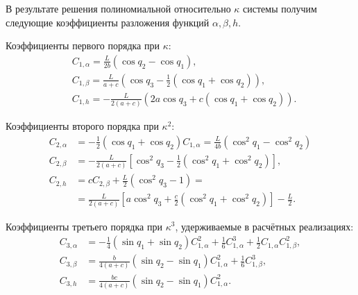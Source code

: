 В результате решения полиномиальной относительно $\kappa$ системы получим следующие коэффициенты разложения функций $\alpha,\beta,h$.

Коэффициенты первого порядка при $\kappa$:
\begin{equation}
\label{eq:DirectKinematicsCoefsApprox1}
\begin{aligned}
	& C_{1,\alpha} = \frac{L}{2b}\left(\cos{q_2} - \cos{q_1}\right),\\
	& C_{1,\beta} = \frac{L}{a+c}\left(\cos{q_3} - \frac{1}{2}\left(\cos{q_1} + \cos{q_2}\right)\right),\\
	& C_{1,h} = -\frac{L}{2\left(a+c\right)}\left(2a\cos{q_3} + c\left(\cos{q_1} + \cos{q_2}\right)\right).
\end{aligned}
\end{equation}

Коэффициенты второго порядка при $\kappa^2$:
\begin{equation}
\label{eq:DirectKinematicsCoefsApprox2}
\begin{aligned}
	C_{2,\alpha} & = - \frac{1}{2}\left(\cos{q_1} + \cos{q_2}\right)C_{1,\alpha}=\frac{L}{4b}\left(\cos^2{q_1} - \cos^2{q_2}\right)\\
	C_{2,\beta} & = -\frac{L}{2\left(a+c\right)}\left[\cos^2{q_3} - \frac{1}{2}\left(\cos^2{q_1} + \cos^2{q_2}\right)\right],\\
	C_{2,h} & = cC_{2,\beta} + \frac{L}{2}\left(\cos^2{q_3} - 1\right) = \\
	& = \frac{L}{2\left(a+c\right)}\left[a\cos^2{q_3} + \frac{c}{2}\left(\cos^2{q_1} + \cos^2{q_2}\right)\right] - \frac{L}{2}.
\end{aligned}
\end{equation}

Коэффициенты третьего порядка при $\kappa^3$, удерживаемые в расчётных реализациях:
\begin{equation}
\label{eq:DirectKinematicsCoefsApprox3}
\begin{aligned}
	C_{3,\alpha} & = -\frac{1}{4}\left(\sin{q_1} + \sin{q_2}\right)C^2_{1,\alpha} + \frac{1}{6}C^3_{1,\alpha} + \frac{1}{2}C_{1,\alpha}C^2_{1,\beta},\\
	C_{3,\beta} & = \frac{b}{4\left(a+c\right)}\left(\sin{q_2} - \sin{q_1}\right)C^2_{1,\alpha} + \frac{1}{6}C^3_{1,\beta},\\
	C_{3,h} & = \frac{bc}{4\left(a+c\right)}\left(\sin{q_2} - \sin{q_1}\right)C^2_{1,\alpha}.
\end{aligned}
\end{equation}

